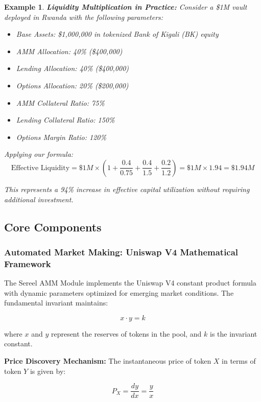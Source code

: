 \documentclass[12pt]{article}
\newtheorem{example}{Example}
\begin{document}
\begin{example}
\textbf{Liquidity Multiplication in Practice:} Consider a \$1M vault deployed in Rwanda with the following parameters:

\begin{itemize}
  \item Base Assets: \$1,000,000 in tokenized Bank of Kigali (BK) equity
  \item AMM Allocation: 40\% (\$400,000)
  \item Lending Allocation: 40\% (\$400,000)
  \item Options Allocation: 20\% (\$200,000)
  \item AMM Collateral Ratio: 75\%
  \item Lending Collateral Ratio: 150\%
  \item Options Margin Ratio: 120\%
\end{itemize}

Applying our formula:
$$\text{Effective Liquidity} = \$1M \times \left(1 + \frac{0.4}{0.75} + \frac{0.4}{1.5} + \frac{0.2}{1.2}\right) = \$1M \times 1.94 = \$1.94M$$

This represents a 94\% increase in effective capital utilization without requiring additional investment.
\end{example}

\subsection{Core Components}

\subsubsection{Automated Market Making: Uniswap V4 Mathematical Framework}

The Sereel AMM Module implements the Uniswap V4 constant product formula with dynamic parameters optimized for emerging market conditions. The fundamental invariant maintains:

\begin{equation}
x \cdot y = k
\end{equation}

where $x$ and $y$ represent the reserves of tokens in the pool, and $k$ is the invariant constant.

\textbf{Price Discovery Mechanism:}
The instantaneous price of token $X$ in terms of token $Y$ is given by:

\begin{equation}
P_X = \frac{dy}{dx} = \frac{y}{x}
\end{equation}
\end{document}
